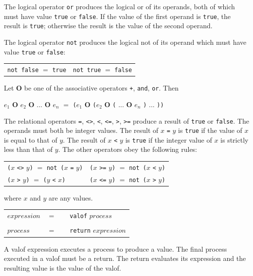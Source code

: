 \documentclass[a4paper, 12pt]{article}
\begin{document}
The logical operator \verb|or| produces the logical or of its operands,
both of which must have value  \verb|true| or \verb|false|. If the value of the first operand 
is \verb|true|, the result is \verb|true|; otherwise the result is the value of the second operand. 

The logical operator \verb|not| produces the logical not of its operand which must have value \verb|true| or \verb|false|:

\begin{tabular}{ll}
\verb|not false| $=$ \verb|true| & \verb|not true| $=$ \verb|false| 
\end{tabular}

Let {\bf O} be one of the associative operators \verb|+|, \verb|and|, \verb|or|. Then 

$e_1$ {\bf O} $e_2$ {\bf O} ... {\bf O} $e_n$ $=$ \verb|(|$e_1$ {\bf O} \verb|(|$e_2$  {\bf O} \verb|(| ...  {\bf O} $e_n$ \verb|)| ... \verb|))|

The relational operators \verb|=|, \verb|<>|, \verb|<|, \verb|<=|, \verb|>|, \verb|>=| produce a result of \verb|true| or \verb|false|.
The operands must both be integer values. The result of $x$ \verb|=| $y$ is \verb|true| if the value of $x$ is equal to that of $y$. 
The result of $x$ \verb|<| $y$ is \verb|true| if the integer value of $x$ is strictly less than that of $y$. The other operators obey 
the following rules:

\begin{tabular}{ll}
\verb|(|$x$ \verb|<>| $y$\verb|)| $=$ \verb|not (|$x$ \verb|=| $y$\verb|)| & \verb|(|$x$ \verb|>=| $y$\verb|)| $=$ \verb|not (|$x$ \verb|<| $y$\verb|)| \\
\verb|(|$x$ \verb|>| $y$\verb|)| $=$ \verb|(|$y$ \verb|<| $x$\verb|)| & \verb|(|$x$ \verb|<=| $y$\verb|)| $=$ \verb|not (|$x$ \verb|>| $y$\verb|)| 
\end{tabular}

where $x$ and $y$ are any values. 

\begin{tabular}{llll}
$expression$    & $=$ &&\verb|valof| $process$ \\
&&&\\
$process$         & $=$ && \verb|return| $expression$
\end{tabular} 

A valof expression executes a process to produce a value. The final process executed in a valof must be a return. The return 
evaluates its expression and the resulting value is the value of the valof. 
\end{document}
